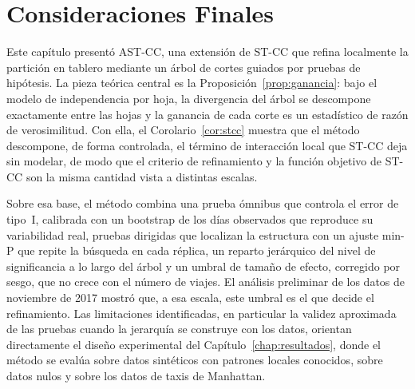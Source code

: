 \section{Consideraciones Finales}\label{sec:prop-final}

Este capítulo presentó AST-CC, una extensión de ST-CC que refina localmente la
partición en tablero mediante un árbol de cortes guiados por pruebas de
hipótesis. La pieza teórica central es la
Proposición~\ref{prop:ganancia}: bajo el modelo de independencia por hoja, la
divergencia del árbol se descompone exactamente entre las hojas y la ganancia de
cada corte es un estadístico de razón de verosimilitud. Con ella, el
Corolario~\ref{cor:stcc} muestra que el método descompone, de forma controlada,
el término de interacción local que ST-CC deja sin modelar, de modo que el
criterio de refinamiento y la función objetivo de ST-CC son la misma cantidad
vista a distintas escalas.

Sobre esa base, el método combina una prueba ómnibus que controla el error de
tipo~I, calibrada con un bootstrap de los días observados que reproduce su
variabilidad real, pruebas dirigidas que localizan la estructura con un ajuste min-P que
repite la búsqueda en cada réplica, un reparto jerárquico del nivel de
significancia a lo largo del árbol y un umbral de tamaño de efecto, corregido por sesgo, que no crece
con el número de viajes. El análisis preliminar de los datos de noviembre de
2017 mostró que, a esa escala, este umbral es el que decide el refinamiento. Las limitaciones identificadas, en particular la
validez aproximada de las pruebas cuando la jerarquía se construye con los
datos, orientan directamente el diseño experimental del
Capítulo~\ref{chap:resultados}, donde el método se evalúa sobre datos sintéticos
con patrones locales conocidos, sobre datos nulos y sobre los datos de taxis de
Manhattan.